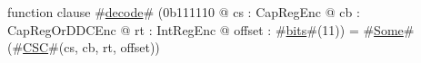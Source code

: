 function clause #\hyperref[sailMIPSzdecode]{decode}# (0b111110 @ cs : CapRegEnc @ cb : CapRegOrDDCEnc @ rt : IntRegEnc @ offset : #\hyperref[sailMIPSzbits]{bits}#(11)) = #\hyperref[sailMIPSzSome]{Some}#(#\hyperref[sailMIPSzCSC]{CSC}#(cs, cb, rt, offset))
